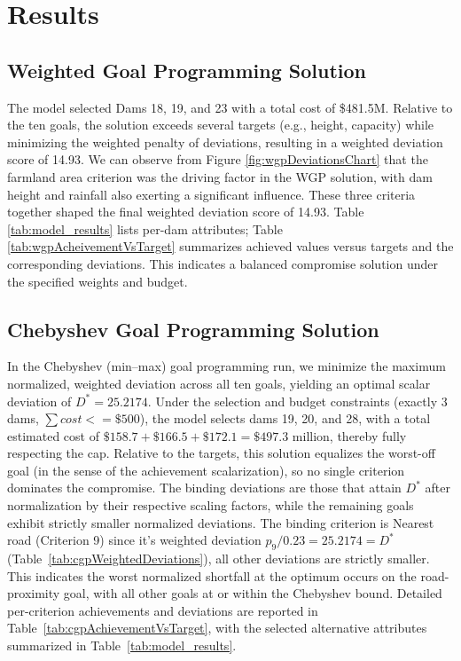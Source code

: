 \section{Results}\label{sec:results}

\subsection{Weighted Goal Programming Solution}
The model selected Dams 18, 19, and 23 with a total cost of \$481.5M. Relative to the ten goals, the solution exceeds several targets (e.g., height, capacity) while minimizing the weighted penalty of deviations, resulting in a weighted deviation score of 14.93. We can observe from Figure \ref{fig:wgpDeviationsChart} that the farmland area criterion was the driving factor in the WGP solution, with dam height and rainfall also exerting a significant influence. These three criteria together shaped the final weighted deviation score of 14.93. Table \ref{tab:model_results} lists per-dam attributes; Table \ref{tab:wgpAcheivementVsTarget}    summarizes achieved values versus targets and the corresponding deviations. This indicates a balanced compromise solution under the specified weights and budget.




\subsection{Chebyshev Goal Programming Solution}
In the Chebyshev (min–max) goal programming run, we minimize the maximum normalized, weighted deviation across all ten goals, yielding an optimal scalar deviation of $ D^* = 25.2174$. Under the selection and budget constraints (exactly 3 dams, $\sum cost <= \$500$), the model selects dams 19, 20, and 28, with a total estimated cost of $\$158.7 + \$166.5 + \$172.1 = \$497.3$ million, thereby fully respecting the cap. Relative to the targets, this solution equalizes the worst-off goal (in the sense of the achievement scalarization), so no single criterion dominates the compromise. The binding deviations are those that attain $ D^*$ after normalization by their respective scaling factors, while the remaining goals exhibit strictly smaller normalized deviations. The binding criterion is Nearest road (Criterion 9) since it's weighted deviation $p_9/0.23 = 25.2174 = D^*$ (Table~\ref{tab:cgpWeightedDeviations}), all other deviations are strictly smaller. This indicates the worst normalized shortfall at the optimum occurs on the road-proximity goal, with all other goals at or within the Chebyshev bound. Detailed per-criterion achievements and deviations are reported in Table~\ref{tab:cgpAchievementVsTarget}, with the selected alternative attributes summarized in Table~\ref{tab:model_results}.

